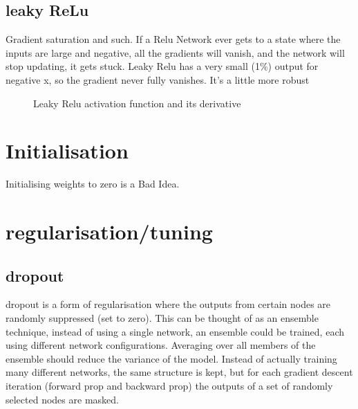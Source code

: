 \documentclass{article}
\begin{document}
\subsection{leaky ReLu}
Gradient saturation and such. If a Relu Network ever gets to a state where the inputs are large and negative, all the gradients will vanish, and the network will stop updating, it gets stuck. Leaky Relu has a very small (1\%) output for negative x, so the gradient never fully vanishes. It's a little more robust
\begin{figure}[tb]
\begin{centering}
\end{centering}
\caption{Leaky Relu activation function and its derivative}

\end{figure}

\section{Initialisation}
Initialising weights to zero is a Bad Idea. 

\section{regularisation/tuning}
\subsection{dropout}
dropout is a form of regularisation where the outputs from certain nodes are randomly suppressed (set to zero). This can be thought of as an ensemble technique, instead of using a single network, an ensemble could be trained, each using different network configurations. Averaging over all members of the ensemble should reduce the variance of the model. Instead of actually training many different networks, the same structure is kept, but for each gradient descent iteration (forward prop and backward prop) the outputs of a set of randomly selected nodes are masked. 
 
\end{document}
